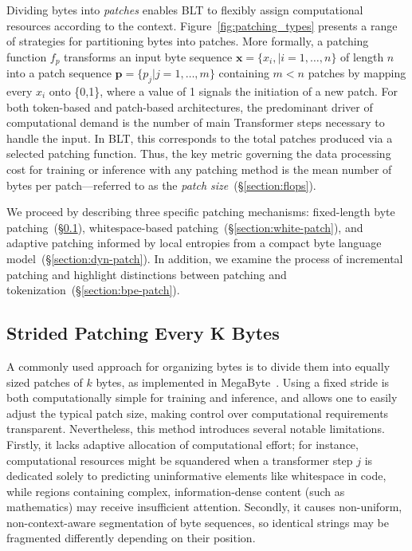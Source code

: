 Dividing bytes into \textit{patches} enables {\textsc BLT} to flexibly assign computational resources according to the context. Figure~\ref{fig:patching_types} presents a range of strategies for partitioning bytes into patches. More formally, a patching function $f_p$ transforms an input byte sequence $\pmb{x} = \{x_i,|i=1,\ldots, n\}$ of length $n$ into a patch sequence $\pmb{p} = \{p_j|j=1,\ldots,m\}$ containing $m < n$ patches by mapping every $x_i$ onto \{0,1\}, where a value of 1 signals the initiation of a new patch. For both token-based and patch-based architectures, the predominant driver of computational demand is the number of main Transformer steps necessary to handle the input. In {\textsc BLT}, this corresponds to the total patches produced via a selected patching function. Thus, the key metric governing the data processing cost for training or inference with any patching method is the mean number of bytes per patch—referred to as the \textit{patch size}~(\S\ref{section:flops}). 

We proceed by describing three specific patching mechanisms: fixed-length byte patching~(\S\ref{section:static-patch}), whitespace-based patching~(\S\ref{section:white-patch}), and adaptive patching informed by local entropies from a compact byte language model~(\S\ref{section:dyn-patch}). In addition, we examine the process of incremental patching and highlight distinctions between patching and tokenization~(\S\ref{section:bpe-patch}).

\subsection{Strided Patching Every K Bytes}
\label{section:static-patch}

A commonly used approach for organizing bytes is to divide them into equally sized patches of $k$ bytes, as implemented in MegaByte~\citep{yu2023megabyte}. Using a fixed stride is both computationally simple for training and inference, and allows one to easily adjust the typical patch size, making control over computational requirements transparent. Nevertheless, this method introduces several notable limitations. Firstly, it lacks adaptive allocation of computational effort; for instance, computational resources might be squandered when a transformer step $j$ is dedicated solely to predicting uninformative elements like whitespace in code, while regions containing complex, information-dense content (such as mathematics) may receive insufficient attention. Secondly, it causes non-uniform, non-context-aware segmentation of byte sequences, so identical strings may be fragmented differently depending on their position.

